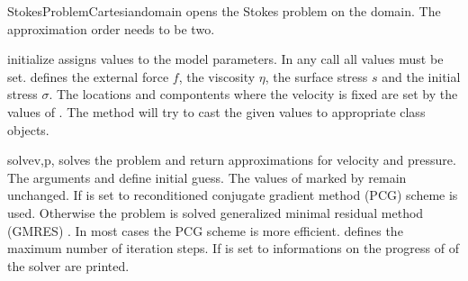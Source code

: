 \begin{classdesc}{StokesProblemCartesian}{domain}
opens the Stokes problem on the \Domain domain. The approximation
order needs to be two.
\end{classdesc}

\begin{methoddesc}[StokesProblemCartesian]{initialize}{}
assigns values to the model parameters. In any call all values must be set.
 defines the external force $f$,  the viscosity $\eta$,
 the surface stress $s$ and  the initial stress $\sigma$.
The locations and compontents where the velocity is fixed are set by 
the values of . The method will try to cast the given values to appropriate 
\Data class objects.
\end{methoddesc}

\begin{methoddesc}[StokesProblemCartesian]{solve}{v,p,
}
solves the problem and return approximations for velocity and pressure. 
The arguments  and  define initial guess. The values of  marked
by  remain unchanged. 
If  is set to \True 
reconditioned conjugate gradient method (PCG)   scheme is used. Otherwise the problem is solved generalized minimal residual method (GMRES) . In most cases 
the PCG scheme is more efficient.
 defines the maximum number of iteration steps. 
If  is set to \True informations on the progress of of the solver are printed.
\end{methoddesc}


